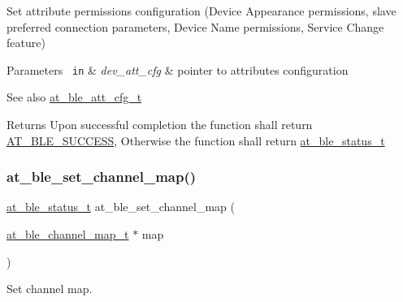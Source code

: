 Set attribute permissions configuration (Device Appearance permissions, slave preferred connection parameters, Device Name permissions, Service Change feature) 


\begin{DoxyParams}[1]{Parameters}
\mbox{\texttt{ in}}  & {\em dev\+\_\+att\+\_\+cfg} & pointer to attributes configuration\\
\hline
\end{DoxyParams}
\begin{DoxySeeAlso}{See also}
\mbox{\hyperlink{structat__ble__att__cfg__t}{at\+\_\+ble\+\_\+att\+\_\+cfg\+\_\+t}}
\end{DoxySeeAlso}
\begin{DoxyReturn}{Returns}
Upon successful completion the function shall return \mbox{\hyperlink{group__error__codes__group_gga3b1db9b95feb157b3c188ca27fe76988a7e3bfff5387331cd4f2c56cbcbbd7e19}{A\+T\+\_\+\+B\+L\+E\+\_\+\+S\+U\+C\+C\+E\+SS}}, Otherwise the function shall return \mbox{\hyperlink{at__ble__api_8h_ace24eb4e5ca3f325c663b809da5feb92}{at\+\_\+ble\+\_\+status\+\_\+t}} 
\end{DoxyReturn}
\mbox{\label{group__gap__dev__config__group_gaabff432b5c853bdc3e8aca925a1fa7b0}} 
\subsubsection{\texorpdfstring{at\_ble\_set\_channel\_map()}{at\_ble\_set\_channel\_map()}}
{\footnotesize\ttfamily \mbox{\hyperlink{group__error__codes__group_ga3b1db9b95feb157b3c188ca27fe76988}{at\+\_\+ble\+\_\+status\+\_\+t}} at\+\_\+ble\+\_\+set\+\_\+channel\+\_\+map (\begin{DoxyParamCaption}\item[{\mbox{\hyperlink{structat__ble__channel__map__t}{at\+\_\+ble\+\_\+channel\+\_\+map\+\_\+t}} $\ast$}]{map }\end{DoxyParamCaption})}



Set channel map. 


